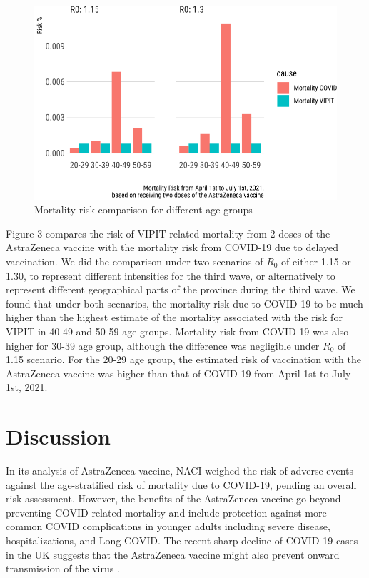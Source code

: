 \documentclass[]{interact}
\theoremstyle{plain}%
\theoremstyle{definition}
\theoremstyle{remark}
\begin{document}
\begin{figure}

{\centering \includegraphics[width=0.7\linewidth]{theCaseforAZ_files/figure-latex/covidvsvipit-1} 

}

\caption{Mortality risk comparison for different age groups}\label{fig:covidvsvipit}
\end{figure}

Figure 3 compares the risk of VIPIT-related mortality from 2 doses of
the AstraZeneca vaccine with the mortality risk from COVID-19 due to
delayed vaccination. We did the comparison under two scenarios of
\(R_0\) of either 1.15 or 1.30, to represent different intensities for
the third wave, or alternatively to represent different geographical
parts of the province during the third wave. We found that under both
scenarios, the mortality risk due to COVID-19 to be much higher than the
highest estimate of the mortality associated with the risk for VIPIT in
40-49 and 50-59 age groups. Mortality risk from COVID-19 was also higher
for 30-39 age group, although the difference was negligible under
\(R_0\) of 1.15 scenario. For the 20-29 age group, the estimated risk of
vaccination with the AstraZeneca vaccine was higher than that of
COVID-19 from April 1st to July 1st, 2021.

\hypertarget{discussion}{%
\section{Discussion}\label{discussion}}

In its analysis of AstraZeneca vaccine, NACI weighed the risk of adverse
events against the age-stratified risk of mortality due to COVID-19,
pending an overall risk-assessment. However, the benefits of the
AstraZeneca vaccine go beyond preventing COVID-related mortality and
include protection against more common COVID complications in younger
adults including severe disease, hospitalizations, and Long COVID. The
recent sharp decline of COVID-19 cases in the UK suggests that the
AstraZeneca vaccine might also prevent onward transmission of the virus
\citep{our_world_in_data_covid-19_2021}.
\end{document}

